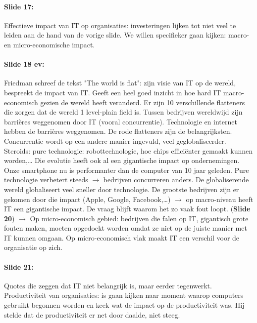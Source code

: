 \documentclass[10pt,a4paper]{report}
\begin{document}
\paragraph{Slide 17:}Effectieve impact van IT op organisaties: investeringen lijken tot niet veel te leiden aan de hand van de vorige slide. We willen specifieker gaan kijken: macro- en micro-economische impact. 

\paragraph{Slide 18 ev:}Friedman schreef de tekst "The world is flat": zijn visie van IT op de wereld, bespreekt de impact van IT. Geeft een heel goed inzicht in hoe hard IT macro-economisch gezien de wereld heeft veranderd. Er zijn 10 verschillende flatteners die zorgen dat de wereld 1 level-plain field is. Tussen bedrijven wereldwijd zijn barrières weggenomen door IT (vooral concurrentie). Technologie en internet hebben de barrières weggenomen. De rode flatteners zijn de belangrijksten. Concurrentie wordt op een andere manier ingevuld, veel geglobaliseerder. Steroids: pure technologie: robottechnologie, hoe chips efficiënter gemaakt kunnen worden,… Die evolutie heeft ook al een gigantische impact op ondernemingen. Onze smartphone nu is performanter dan de computer van 10 jaar geleden. Pure technologie verbetert steeds $\rightarrow$ bedrijven concurreren anders. De globaliserende wereld globaliseert veel sneller door technologie. De grootste bedrijven zijn er gekomen door die impact (Apple, Google, Facebook,…) $\rightarrow$ op macro-niveau heeft IT een gigantische impact. De vraag blijft waarom het zo vaak fout loopt. (\textbf{Slide 20}) $\rightarrow$ Op micro-economisch gebied: bedrijven die falen op IT, gigantisch grote fouten maken, moeten opgedoekt worden omdat ze niet op de juiste manier met IT kunnen omgaan. Op micro-economisch vlak maakt IT een verschil voor de organisatie op zich. 

\paragraph{Slide 21:}Quotes die zeggen dat IT niet belangrijk is, maar eerder tegenwerkt. Productiviteit van organisaties: is gaan kijken naar moment waarop computers gebruikt begonnen worden en keek wat de impact op de productiviteit was. Hij stelde dat de productiviteit er net door daalde, niet steeg. 
\end{document}
